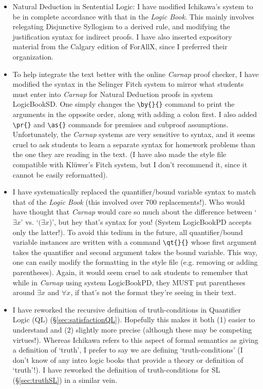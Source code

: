 \begin{itemize}

\item Natural Deduction in Sentential Logic: I have modified Ichikawa's system to be in complete accordance with that in the \textit{Logic Book}. This mainly involves relegating Disjunctive Syllogism to a derived rule, and modifying the justification syntax for indirect proofs.  I have also inserted expository material from the Calgary edition of ForAllX, since I preferred their organization. 

\item To help integrate the text better with the online \textit{Carnap} proof checker, I have modified the syntax in the Selinger Fitch system to mirror what students must enter into \textit{Carnap} for Natural Deduction proofs in system LogicBookSD. One simply changes the \verb|\by{}{}| command to print the arguments in the opposite order, along with adding a colon first. I also added \verb|\pr{}| and \verb|\as{}| commands for premises and subproof assumptions. Unfortunately, the \textit{Carnap} systems are very sensitive to syntax, and it seems cruel to ask students to learn a separate syntax for homework problems than the one they are reading in the text. (I have also made the style file compatible with Kl{\"u}wer's Fitch system, but I don't recommend it, since it cannot be easily reformatted). 

\item I have systematically replaced the quantifier/bound variable syntax to match that of the \textit{Logic Book} (this involved over 700 replacements!). Who would have thought that \textit{Carnap} would care so much about the difference between `$\exists x$' vs. `$(\exists x$)', but hey that's syntax for you! (System LogicBookPD accepts only the latter!). To avoid this tedium in the future, all quantifier/bound variable instances are written with a command \verb|\qt{}{}| whose first argument takes the quantifier and second argument takes the bound variable. This way, one can easily modify the formatting in the style file (e.g. removing or adding parentheses). Again, it would seem cruel to ask students to remember that while in \textit{Carnap} using system LogicBookPD, they MUST put parentheses around $\exists x$ and $\forall x$, if that's not the format they're seeing in their text. 

\item I have reworked the recursive definition of truth-conditions in Quantifier Logic (QL) (\S\ref{sec:satisfactionQL}). Hopefully this makes it both (1) easier to understand and (2) slightly more precise (although these may be competing virtues!). Whereas Ichikawa refers to this aspect of formal semantics as giving a definition of `truth', I prefer to say we are defining `truth-conditions' (I don't know of any intro logic books that provide a theory or definition of `truth'!). I have reworked the definition of truth-conditions for SL (\S\ref{sec:truthSL}) in a similar vein. 


\end{itemize}
